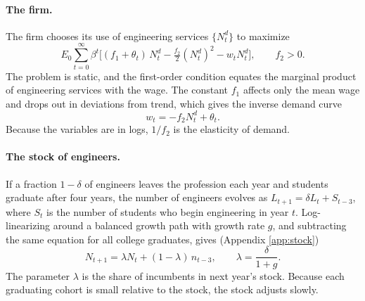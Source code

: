 \documentclass[12pt]{article}
\begin{document}
\paragraph{The firm.} The firm chooses its use of engineering services $\{N^{d}_t\}$ to maximize
\begin{equation}\label{eq:firm}
  E_0 \sum_{t=0}^{\infty} \beta^{t}
  \Big[ (f_1 + \theta_t)\, N^{d}_t - \tfrac{f_2}{2} (N^{d}_t)^{2} - w_t N^{d}_t \Big], \qquad f_2>0 .
\end{equation}
The problem is static, and the first-order condition equates the marginal product of engineering services with the wage. The constant $f_1$ affects only the mean wage and drops out in deviations from trend, which gives the inverse demand curve
\begin{equation}\label{eq:demand}
  w_t = -f_2 N^{d}_t + \theta_t .
\end{equation}
Because the variables are in logs, $1/f_2$ is the elasticity of demand.

\paragraph{The stock of engineers.} If a fraction $1-\delta$ of engineers leaves the profession each year and students graduate after four years, the number of engineers evolves as $L_{t+1} = \delta L_t + S_{t-3}$, where $S_t$ is the number of students who begin engineering in year $t$. Log-linearizing around a balanced growth path with growth rate $g$, and subtracting the same equation for all college graduates, gives (Appendix \ref{app:stock})
\begin{equation}\label{eq:stock}
  N_{t+1} = \lambda N_t + (1-\lambda)\, n_{t-3}, \qquad \lambda = \frac{\delta}{1+g} .
\end{equation}
The parameter $\lambda$ is the share of incumbents in next year's stock. Because each graduating cohort is small relative to the stock, the stock adjusts slowly.
\end{document}
